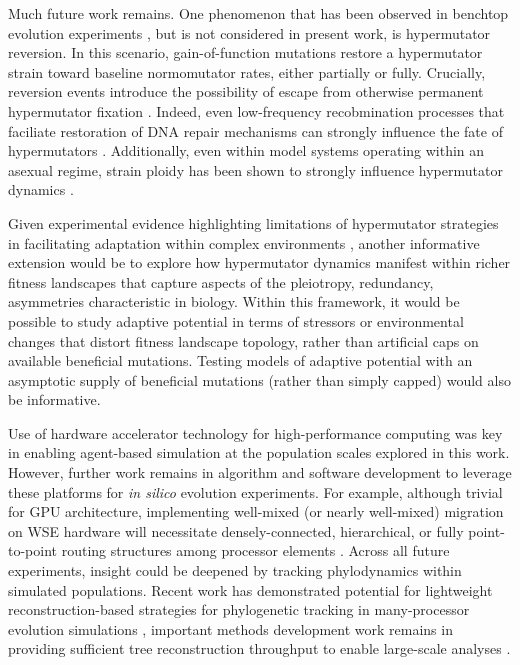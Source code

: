 Much future work remains.
One phenomenon that has been observed in benchtop evolution experiments \citep{ho2021evolutionary}, but is not considered in present work, is hypermutator reversion.
In this scenario, gain-of-function mutations restore a hypermutator strain toward baseline normomutator rates, either partially or fully.
Crucially, reversion events introduce the possibility of escape from otherwise permanent hypermutator fixation \citep{taddei1997role}.
Indeed, even low-frequency recobmination processes that faciliate restoration of DNA repair mechanisms can strongly influence the fate of hypermutators \citep{tenaillon2000mutators}.
Additionally, even within model systems operating within an asexual regime, strain ploidy has been shown to strongly influence hypermutator dynamics \citep{thompson2006ploidy}.

Given experimental evidence highlighting limitations of hypermutator strategies in facilitating adaptation within complex environments \citep{ho2021evolutionary}, another informative extension would be to explore how hypermutator dynamics manifest within richer fitness landscapes that capture aspects of the pleiotropy, redundancy, asymmetries characteristic in biology.
Within this framework, it would be possible to study adaptive potential in terms of stressors or environmental changes that distort fitness landscape topology, rather than artificial caps on available beneficial mutations.
Testing models of adaptive potential with an asymptotic supply of beneficial mutations (rather than simply capped) would also be informative.

Use of hardware accelerator technology for high-performance computing was key in enabling agent-based simulation at the population scales explored in this work.
However, further work remains in algorithm and software development to leverage these platforms for \textit{in silico} evolution experiments.
For example, although trivial for GPU architecture, implementing well-mixed (or nearly well-mixed) migration on WSE hardware will necessitate densely-connected, hierarchical, or fully point-to-point routing structures among processor elements \citep{james2020physical,luczynski2024near}.
Across all future experiments, insight could be deepened by tracking phylodynamics within simulated populations.
Recent work has demonstrated potential for lightweight reconstruction-based strategies for phylogenetic tracking in many-processor evolution simulations \citep{moreno2022hereditary}, important methods development work remains in providing sufficient tree reconstruction throughput to enable large-scale analyses \citep{moreno2024trackable}.

